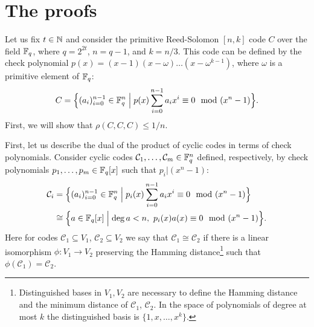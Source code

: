 \documentclass[11pt]{article}
\newcommand{\cC}{\mathcal{C}}
\begin{document}
\section{The proofs}
Let us fix $t\in \mathbb{N}$ and consider the primitive Reed-Solomon $[n,k]$ code $C$ over the field $\mathbb{F}_q$, where $q=2^{2t}$, $n=q-1$, and $k=n/3$. This code can be defined by the check polynomial $p(x)=(x-1)(x-\omega)\ldots (x-\omega^{k-1})$, where $\omega$ is a primitive element of $\mathbb{F}_q$:
\[
C = \Bigl\{(a_i)_{i=0}^{n-1}\in \mathbb{F}_q^n\Bigm| p(x)\sum_{i=0}^{n-1}a_ix^i\equiv 0\mod (x^n-1)\Bigr\}.
\]
First, we will show that $\rho(C,C,C)\le 1/n$.

First, let us describe the dual of the product of cyclic codes in terms of check polynomials. Consider cyclic codes $\cC_1,\ldots,\cC_m\in \F_q^n$ defined, respectively, by check polynomials $p_1,\ldots,p_m\in \mathbb{F}_q[x]$ such that $p_i|(x^n-1)$:
\begin{align*}
    \cC_i&=\Bigfbr{(a_i)_{i=0}^{n-1}\in \F_q^n\Bigm| p_i(x)\sum_{i=0}^{n-1}a_ix^i\equiv 0\mod (x^n-1)}\\
    &\cong \Bigfbr{a\in \F_q[x]\Bigm| \deg a<n,\ p_i(x)a(x)\equiv 0\mod (x^n-1)}.
\end{align*}
Here for codes $\cC_1\subseteq V_1$, $\cC_2\subseteq V_2$ we say that $\cC_1\cong\cC_2$ if %
there is a linear isomorphism $\phi:V_1\to V_2$ preserving the Hamming distance\footnote{Distinguished bases in $V_1,V_2$ are necessary to define the Hamming distance and the minimum distance of $\cC_1$, $\cC_2$. In the space of polynomials of degree at most $k$ the distinguished basis is $\{1,x,\ldots,x^k\}$.} such that $\phi(\cC_1)=\cC_2$. %
\end{document}
